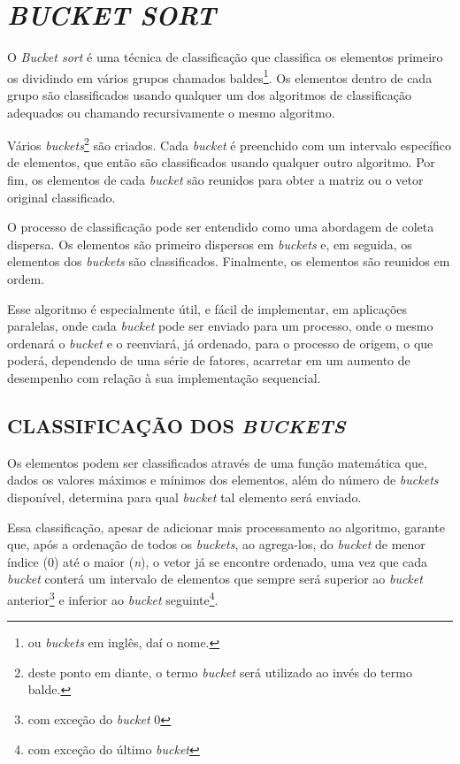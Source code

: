 \section{\normalsize \textit{BUCKET SORT}}\label{bucket}
	O \textit{Bucket sort} é uma técnica de classificação que classifica os elementos primeiro os dividindo em vários grupos chamados baldes\footnote{ou \textit{buckets} em inglês, daí o nome.}. Os elementos dentro de cada grupo são classificados usando qualquer um dos algoritmos de classificação adequados ou chamando recursivamente o mesmo algoritmo.

Vários \textit{buckets}\footnote{deste ponto em diante, o termo \textit{bucket} será utilizado ao invés do termo balde.} são criados. Cada \textit{bucket} é preenchido com um intervalo específico de elementos, que então são  classificados usando qualquer outro algoritmo. Por fim, os elementos de cada \textit{bucket} são reunidos para obter a matriz ou o vetor original classificado.

O processo de classificação pode ser entendido como uma abordagem de coleta dispersa. Os elementos são primeiro dispersos em \textit{buckets} e, em seguida, os elementos dos \textit{buckets} são classificados. Finalmente, os elementos são reunidos em ordem.

Esse algoritmo é especialmente útil, e fácil de implementar, em aplicações paralelas, onde cada \textit{bucket} pode ser enviado para um processo, onde o mesmo ordenará o \textit{bucket} e o reenviará, já ordenado, para o processo de origem, o que poderá, dependendo de uma série de fatores, acarretar em um aumento de desempenho com relação à sua implementação sequencial.

	\subsection{\normalsize CLASSIFICAÇÃO DOS \textit{BUCKETS}}\label{classification}
		Os elementos podem ser classificados através de uma função matemática que, dados os valores máximos e mínimos dos elementos, além do número de \textit{buckets} disponível, determina para qual \textit{bucket} tal elemento será enviado.
		
		Essa classificação, apesar de adicionar mais processamento ao algoritmo, garante que, após a ordenação de todos os \textit{buckets}, ao agrega-los, do \textit{bucket} de menor índice (0) até o maior (\textit{n}), o vetor já se encontre ordenado, uma vez que cada \textit{bucket} conterá  um intervalo de elementos que sempre será superior ao \textit{bucket} anterior\footnote{com exceção do \textit{bucket} 0} e inferior ao \textit{bucket} seguinte\footnote{com exceção do último \textit{bucket}}.
		
